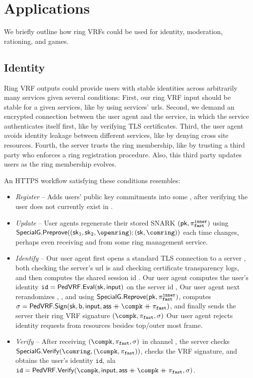 \section{Applications}
\label{sec:app_short}

We briefly outline how ring VRFs could be used for
identity, moderation, rationing, and games.


\subsection{Identity}
\label{subsec:app_identity}

Ring VRF outputs could provide users with stable identities across
arbitrarily many services given several conditions:
First, our ring VRF input should be stable for a given services,
like by using services' urls.
Second, we demand an encrypted connection between the user agent and
the service, in which the service authenticates itself first,
like by verifying TLS certificates.
Third, the user agent avoids identity leakage between different services,
like by denying cross site resources.
Fourth, the server trusts the ring membership, like by trusting
a third party who enforces a ring registration procedure.
Also, this third party updates users as the ring membership evolves.

An HTTPS workflow satisfying these conditions resembles:

\begin{itemize}
	\item {\em Register} --
	Adds users' public key commitments into some \ring,
	after verifying the user does not currently exist in \ring.
	\item {\em Update} --
	User agents regenerate their stored SNARK $(\mathsf{pk},\pi_{\mathtt{fast}}^{\mathtt{inner}})$ using
	$\SpecialG.\Preprove( (\sk_1,\sk_2,\openring); (\sk,\comring) )$
	each time \ring changes, perhaps even receiving \comring and \openring
	from some ring management service.
	\item {\em Identify} --
	Our user agent first opens a standard TLS connection to a server \msg,
	both checking the server's url is \msg and checking certificate
	transparency logs, and then computes the shared session id \aux.
	Our user agent computes the user's identity
	$\mathtt{id} = {\mathsf{PedVRF}}.{\mathsf{Eval}}(\mathsf{sk},\mathsf{input})$ on the server id \msg,
	Our user agent next rerandomizes \pifast, \compk, and \openpk using
	${\mathsf{SpecialG}}.{\mathsf{Reprove}}( \mathsf{pk}, \pi_{\mathtt{fast}}^{\mathtt{inner}} )$, computes
	$\sigma = \PedVRF.\Sign(\sk,\openpk,\msg,\aux \doubleplus \compk \doubleplus \pifast)$,
	and finally sends the server their ring VRF signature $(\compk,\pifast,\sigma)$
	Our user agent rejects identity requests from resources besides
	top/outer most frame.
	\item {\em Verify} -- 
	After receiving $(\compk,\pifast,\sigma)$ in channel \aux,
	the server \msg checks $\SpecialG.\Verify( \comring, (\compk,\pifast) )$,
	checks the VRF signature, and obtains the user's identity $\mathtt{id}$, ala \\
	$\mathtt{id} = \PedVRF.\Verify(\compk,\msg,\aux \doubleplus \compk \doubleplus \pifast,\sigma)$.
\end{itemize}

